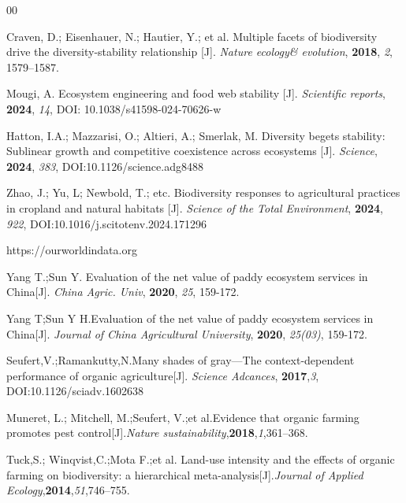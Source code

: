 \documentclass[12pt]{article}
\begin{document}
	
	
	\newpage
	\begin{thebibliography}{00}
		
		Craven, D.; Eisenhauer, N.; Hautier, Y.; et al. Multiple facets of biodiversity drive the diversity-stability relationship [J]. \emph{Nature ecology\& evolution}, \textbf{2018}, \emph{2}, 1579--1587.
		
		Mougi, A. Ecosystem engineering and food web stability [J]. \emph{Scientific reports}, \textbf{2024}, \emph{14}, DOI: 10.1038/s41598-024-70626-w 
		
		
		Hatton, I.A.; Mazzarisi, O.; Altieri, A.; Smerlak, M. Diversity begets stability: Sublinear growth and competitive coexistence across ecosystems [J]. \emph{Science}, \textbf{2024}, \emph{383}, DOI:10.1126/science.adg8488
		
		
		Zhao, J.; Yu, L; Newbold, T.; etc. Biodiversity responses to agricultural practices in cropland and natural habitats [J]. \emph{Science of the Total Environment}, \textbf{2024}, \emph{922}, DOI:10.1016/j.scitotenv.2024.171296
		
		https://ourworldindata.org
		
		Yang T.;Sun Y. Evaluation of the net value of paddy ecosystem services in China[J]. \emph{China Agric. Univ},  \textbf{2020},  \emph{25}, 159-172.
		
		Yang T;Sun Y H.Evaluation of the net value of paddy ecosystem services in China[J]. \emph{Journal of China Agricultural University}, \textbf{2020}, \emph{25(03)}, 159-172.
		
		Seufert,V.;Ramankutty,N.Many shades of gray—The context-dependent performance of organic agriculture[J]. \emph{Science Adcances}, \textbf{2017},\emph{3}, DOI:10.1126/sciadv.1602638
		
		Muneret, L.; Mitchell, M.;Seufert, V.;et al.Evidence that organic farming promotes pest control[J].\emph{Nature sustainability},\textbf{2018},\emph{1},361–368.
		
		Tuck,S.; Winqvist,C.;Mota F.;et al. Land-use intensity and the effects of organic farming on biodiversity: a hierarchical meta-analysis[J].\emph{Journal of Applied Ecology},\textbf{2014},\emph{51},746–755.
		
		
		
	\end{thebibliography}
	
\end{document}
